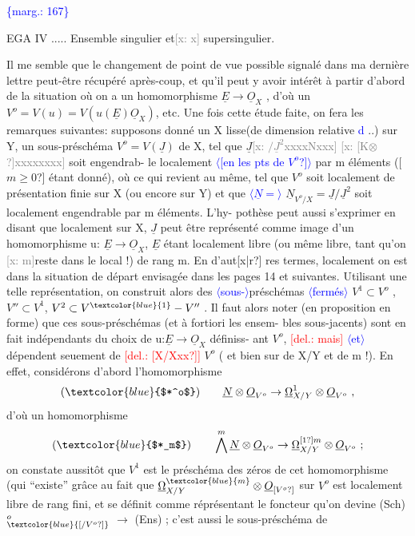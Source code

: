 \documentclass[11pt]{article}
\newcommand{\scanpage}[1]{\par\bigskip\noindent{\small\sffamily[scan #1]}\par}
\newcommand{\mspage}[1]{{\small\sffamily[p.\,#1]}}
\newcommand{\hand}[1]{\textcolor{blue}{#1}}
\let\over\relax
\newcommand{\over}[2]{\textcolor{gray}{#1}\textcolor{blue}{\ensuremath{^{\!\nearrow}}#2}}
\newcommand{\inserted}[2][]{\textcolor{blue}{$\langle$#2$\rangle$}}
\newcommand{\margin}[1]{\textcolor{blue}{\{\textsf{marg.:} #1\}}}
\newcommand{\deleted}[1]{\textcolor{red}{[\textsf{del.:} #1]}}
\newcommand{\xout}[1]{\textcolor{gray}{[\textsf{x:} #1]}}
\newcommand{\unsure}[1]{[#1?]}
\begin{document}
\margin{167}

\clearpage
\scanpage{25/168}
\mspage{3}

EGA IV ..... Ensemble singulier et\xout{x} supersingulier.

Il me semble que le changement de point de vue possible signalé dans ma
dernière lettre peut-être récupéré après-coup, et qu'il peut y avoir intérêt
à partir d'abord de la situation où on a  un homomorphisme $\underline{E}\to\underline{O}_X$ , d'où
un $V^o = V(u) = V(u(\underline{E})\underline{O}_X)$, etc. Une fois cette étude faite, on fera les
remarques suivantes: supposons donné un X lisse(de dimension relative \hand{d} ..)
sur Y, un sous-préschéma $V^o = V(\underline{J})$ de X, tel que $\underline{J}$\xout{$/\underline{J}^2$xxxxNxxx} \xout{\unsure{K$\otimes$}xxxxxxxx} soit engendrab-%
le localement \inserted{\unsure{en les pts de $V^o$}} par m éléments (\unsure{$m \geq 0$} étant donné), où ce qui revient au
même, tel que $V^o$ soit localement de présentation finie sur X (ou encore sur
Y) et que \inserted{$\underline{N} =$} $\underline{N}_{V^o/X} = \underline{J}/\underline{J}^2$  soit localement engendrable par m éléments.  L'hy-%
pothèse peut aussi s'exprimer en disant que localement sur X, $\underline{J}$ peut être
représenté comme image d'un homomorphisme  u: $\underline{E}\to\underline{O}_X$, $\underline{E}$ étant localement
libre (ou même libre, tant qu'on \xout{m}reste dans le local !) de rang m.  En d'aut\unsure{x|r}
res termes, localement on est dans la situation de départ envisagée dans
les pages 14 et suivantes. Utilisant une telle représentation, on construit
alors des \inserted{sous-}préschémas \inserted{fermés} $V^1 \subset V^o$ , $V'' \subset V^1$, $V^2 \subset V^{\hand{1}}-V''$ . Il faut alors noter
(en proposition en forme) que ces sous-préschémas (et à fortiori les ensem-%
bles sous-jacents) sont en fait indépendants du choix de u:$\underline{E}\to\underline{O}_X$ définiss-%
ant $V^o$, \deleted{mais} \inserted{et} dépendent seu\over{\unsure{x}}{l}ement de \deleted{\unsure{X/Xxx}} $V^o$ ( et bien sur de X/Y et de
m !).  En effet, considérons d'abord  l'homomorphisme
\[ (\hand{$*^o$}) \qquad \underline{N}\otimes\underline{O}_{V^o}\to\underline{\Omega}^1_{X/Y}\otimes\underline{O}_{V^o} \ , \]
d'où  un homomorphisme
\[ (\hand{$*_m$}) \qquad \bigwedge^m\underline{N}\otimes\underline{O}_{V^o}\to\underline{\Omega}^{\over{\unsure{1}}{m}}_{X/Y}\otimes\underline{O}_{V^o}\ ; \]
on constate aussitôt que $V^1$ est le préschéma des zéros de cet homomorphisme
(qui ``existe'' grâce au fait que $\underline{\Omega}^{\hand{m}}_{X/Y}\otimes\underline{O}_{\unsure{V^o}}$  sur  $V^o$ est localement libre
de rang fini, et se définit comme réprésentant le foncteur qu'on devine
(Sch)$^o_{\hand{\unsure{/V^o}}}$ $\longrightarrow$ (Ens) ; c'est aussi le sous-préschéma de \over{V}{\unsure{$V^o$}}
\end{document}
